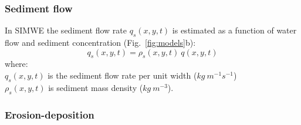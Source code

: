 \documentclass[esurf, manuscript]{copernicus}
\begin{document}


\subsubsection{Sediment flow}

In SIMWE the sediment flow rate $q_s(x,y,t)$ is estimated 
as a function of water flow and sediment concentration
(Fig.~\ref{fig:models}b): %
\begin{equation}\label{eq:sedflow} 
q_s(x,y,t) = \rho_s(x,y,t) ~ q(x,y,t)
\end{equation}
{\small
\noindent
where: \\
\hspace*{0.5em} $q_s(x,y,t)$ is the sediment flow rate per unit width ($kg~m^{-1}s^{-1}$)\\
\hspace*{0.5em} $\rho_s(x,y,t)$ is sediment mass density ($kg~m^{-3}$).\\
}



\subsubsection{Erosion-deposition}
\end{document}
